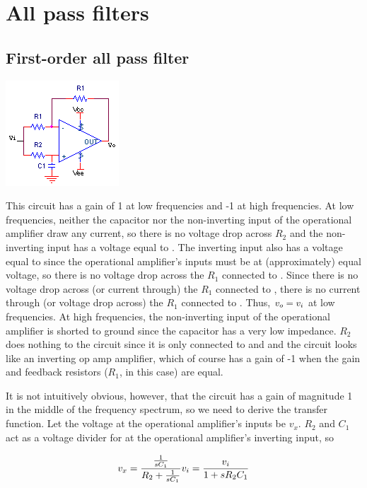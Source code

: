 \section{All pass filters}
\subsection{First-order all pass filter}
\begin{center}
	\includegraphics{schematics/1storderallpassfilter.PNG}
\end{center}
This circuit \autocite[328]{op-amps-for-everyone} has a gain of 1 at low frequencies and -1 at high frequencies.
At low frequencies, neither the capacitor nor the non-inverting input of the operational amplifier draw any current, so there is no voltage drop across $R_2$ and the non-inverting input has a voltage equal to \vin.
The inverting input also has a voltage equal to \vin since the operational amplifier's inputs must be at (approximately) equal voltage, so there is no voltage drop across the $R_1$ connected to \vin.
Since there is no voltage drop across (or current through) the $R_1$ connected to \vin, there is no current through (or voltage drop across) the $R_1$ connected to \vout. Thus, $\vout = \vin$ at low frequencies.
At high frequencies, the non-inverting input of the operational amplifier is shorted to ground since the capacitor has a very low impedance.
$R_2$ does nothing to the circuit since it is only connected to \vin and \gnd and the circuit looks like an inverting op amp amplifier, which of course has a gain of -1 when the gain and feedback resistors ($R_1$, in this case) are equal.

It is not intuitively obvious, however, that the circuit has a gain of magnitude 1 in the middle of the frequency spectrum, so we need to derive the transfer function.
Let the voltage at the operational amplifier's inputs be $v_x$.
$R_2$ and $C_1$ act as a voltage divider for \vin at the operational amplifier's inverting input, so

\begin{equation}v_x = \frac{\frac{1}{sC_1}}{R_2 + \frac{1}{sC_1}}\vin = \frac{\vin}{1+sR_2 C_1}
\end{equation}

